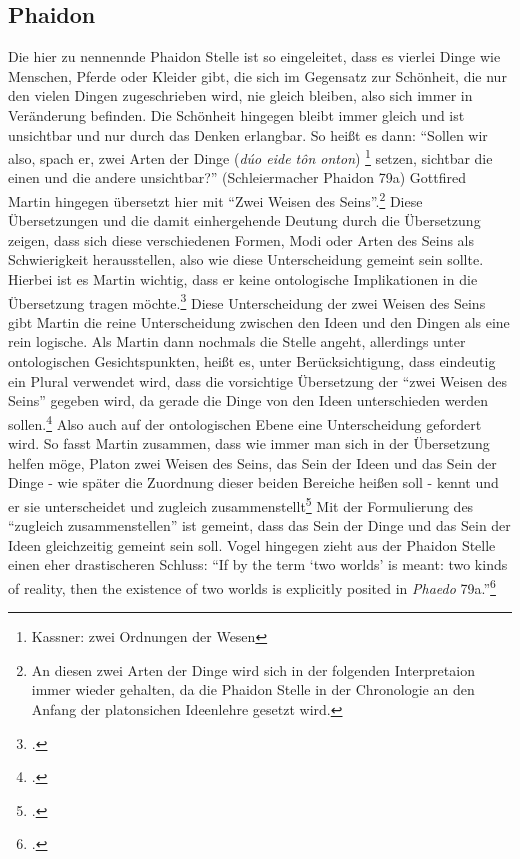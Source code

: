 \subsection{Phaidon}
Die hier zu nennennde Phaidon Stelle ist so eingeleitet, dass es vierlei Dinge wie Menschen, Pferde oder Kleider gibt, die sich im Gegensatz zur Schönheit, die nur den vielen Dingen zugeschrieben wird, nie gleich bleiben, also sich immer in Veränderung befinden. Die Schönheit hingegen bleibt immer gleich und ist unsichtbar und nur durch das Denken erlangbar.
So heißt es dann: \enquote{Sollen wir also, spach er, zwei Arten der Dinge (\emph{dúo eide tôn onton})  \footnote{Kassner: zwei Ordnungen der Wesen\nocite{PhaidonKassner}} setzen, sichtbar die einen und die andere unsichtbar?} (Schleiermacher \nocite{PhaidonSchleiermacher}Phaidon 79a)
Gottfired Martin hingegen übersetzt hier mit \enquote{Zwei Weisen des Seins}.\footnote{An diesen zwei Arten der Dinge wird sich in der folgenden Interpretaion immer wieder gehalten, da die Phaidon Stelle in der Chronologie an den Anfang der platonsichen Ideenlehre gesetzt wird.}
Diese Übersetzungen und die damit einhergehende Deutung durch die Übersetzung zeigen, dass sich diese verschiedenen Formen, Modi oder Arten des Seins als Schwierigkeit herausstellen, also wie diese Unterscheidung gemeint sein sollte. Hierbei ist es Martin wichtig, dass er keine ontologische Implikationen in die Übersetzung tragen möchte.\footcite[vgl.][S. 37]{Martin73} Diese Unterscheidung der zwei Weisen des Seins gibt Martin die reine Unterscheidung zwischen den Ideen und den Dingen als eine rein logische. 
Als Martin dann nochmals die Stelle angeht, allerdings unter ontologischen Gesichtspunkten, heißt es, unter Berücksichtigung, dass eindeutig ein Plural verwendet wird, dass die vorsichtige Übersetzung der \enquote{zwei Weisen des Seins} gegeben wird, da gerade die Dinge von den Ideen unterschieden werden sollen.\footcite[vgl.][S. 216]{Martin73} Also auch auf der ontologischen Ebene eine Unterscheidung gefordert wird. So fasst Martin zusammen, dass wie immer man sich in der Übersetzung helfen möge, Platon zwei Weisen des Seins, das Sein der Ideen und das Sein der Dinge - wie später die Zuordnung dieser beiden Bereiche heißen soll - kennt und er sie unterscheidet und zugleich zusammenstellt\footcite[vgl.][S. 216]{Martin73}
Mit der Formulierung des \enquote{zugleich zusammenstellen} ist gemeint, dass das Sein der Dinge und das Sein der Ideen gleichzeitig gemeint sein soll.
Vogel hingegen zieht aus der Phaidon Stelle einen eher drastischeren Schluss:
\enquote{If by the term \enquote{two worlds} is meant: two kinds of reality, then the existence of two worlds is explicitly posited in \emph{Phaedo} 79a.}\footcite[][S. 161]{Vogel}
